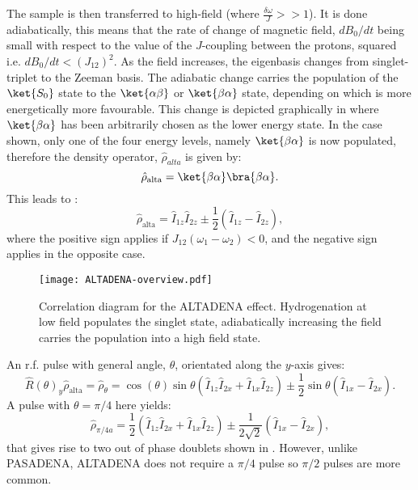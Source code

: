  The sample is then transferred to high-field (where $\frac{\delta{\omega}}{J}>>1$). It is done adiabatically, this means that the rate
 of change of magnetic field, $dB_0/dt$ being small with respect to the value of the $J$-coupling between the protons, squared i.e. $dB_0/dt < (J_{12})^2$. As
 the field increases, the eigenbasis changes from singlet-triplet to the Zeeman basis. The adiabatic change carries the population of the
 $\ket{S_0}$ state to the $\ket{\alpha\beta}$ or $\ket{\beta\alpha}$ state, depending on which is more energetically more favourable.
 This change is depicted graphically in  where $\ket{\beta\alpha}$ has been arbitrarily chosen as the lower energy state.
 In the case shown, only one of the four energy levels, namely $\ket{\beta\alpha}$ is now populated, therefore the density operator, $\hat{\rho}_{alta}$ is given by:
 \begin{equation}
   \hat{\rho}_{\text{alta}} = \ket{\beta\alpha}\bra{\beta\alpha}.
 \end{equation}
  This leads to \citep{RN128}:
 \begin{equation}
   \hat{\rho}_{\text{alta}} = \hat{I}_{1z}\hat{I}_{2z}±\frac{1}{2}(\hat{I}_{1z}-\hat{I}_{2z}),
 \end{equation}
 where the positive sign applies if $J_{12}(\omega_1 - \omega_2)<0$, and the negative
 sign applies in the opposite case.

 \begin{figure}
   \begin{center}
   \texttt{[image: ALTADENA-overview.pdf]}
   \end{center}
   \caption{Correlation diagram for the ALTADENA effect. Hydrogenation at low field populates the singlet state, adiabatically increasing
   the field carries the population into a high field state.}
   \label{fig:SingletTriplet}
 \end{figure}

 An r.f. pulse with general angle, $\theta$, orientated along the $y$-axis gives:
 \begin{equation}
   \hat{R}(\theta)_y\hat{\rho}_{\text{alta}} = \hat{\rho}_\theta = \cos(\theta)\sin{\theta}(\hat{I}_{1z}\hat{I}_{2x} + \hat{I}_{1x}\hat{I}_{2z})
   ± \frac{1}{2}\sin\theta(\hat{I}_{1x} - \hat{I}_{2x}).
 \end{equation}
 A pulse with $\theta = \pi/4$ here yields:
 \begin{equation}
   \hat{\rho}_{\pi/4a} = \frac{1}{2}(\hat{I}_{1z}\hat{I}_{2x} + \hat{I}_{1x}\hat{I}_{2z}) ± \frac{1}{2\sqrt{2}}(\hat{I}_{1x} - \hat{I}_{2x}),
 \end{equation}
 that gives rise to two out of phase doublets shown in .
 However, unlike PASADENA, ALTADENA does not require
 a $\pi/4$ pulse so $\pi/2$ pulses are more common.

